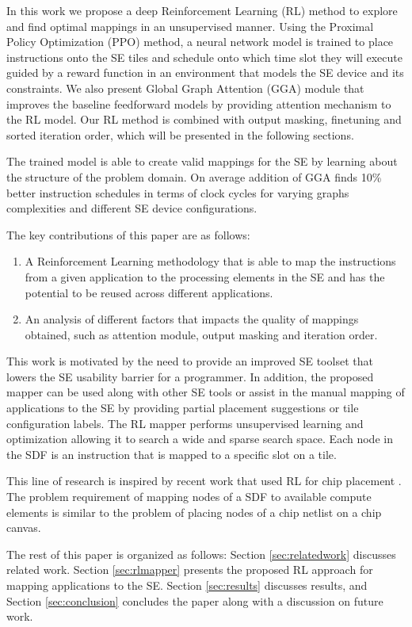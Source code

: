 In this work we propose a deep Reinforcement Learning (RL) method to explore and find optimal mappings in an unsupervised manner. 
Using the Proximal Policy Optimization (PPO) method, a neural network model is trained to place instructions onto the SE tiles and schedule onto which time slot they will execute guided by a reward function in an environment that models the SE device and its constraints. 
We also present Global Graph Attention (GGA) module that improves the baseline feedforward models by providing attention mechanism to the RL model.
Our RL method is combined with output masking, finetuning and sorted iteration order, which will be presented in the following sections.

The trained model is able to create valid mappings for the SE by learning about the structure of the problem domain.
On average addition of GGA finds 10\% better instruction schedules in terms of clock cycles for varying graphs complexities and different SE device configurations.

The key contributions of this paper are as follows:
\begin{enumerate}
    \item A Reinforcement Learning methodology that is able to map the instructions from a given application to the processing elements in the SE and has the potential to be reused across different applications.
    \item An analysis of different factors that impacts the quality of mappings obtained, such as attention module, output masking and iteration order.
\end{enumerate}

This work is motivated by the need to provide an improved SE toolset that lowers the SE usability barrier for a programmer.
In addition, the proposed mapper can be used along with other SE tools or assist in the manual mapping of applications to the SE by providing partial placement suggestions or tile configuration labels.
The RL mapper performs unsupervised learning and optimization allowing it to search a wide and sparse search space. 
Each node in the SDF is an instruction that is mapped to a specific slot on a tile.

This line of research is inspired by recent work that used RL for chip placement \cite{mirhoseini2020chip}.
The problem requirement of mapping nodes of a SDF to available compute elements is similar to the problem of placing nodes of a chip netlist on a chip canvas. 

The rest of this paper is organized as follows: 
Section \ref{sec:relatedwork} discusses related work.
Section \ref{sec:rlmapper} presents the proposed RL approach for mapping applications to the SE.
Section \ref{sec:results} discusses results, and Section \ref{sec:conclusion} concludes the paper along with a discussion on future work.